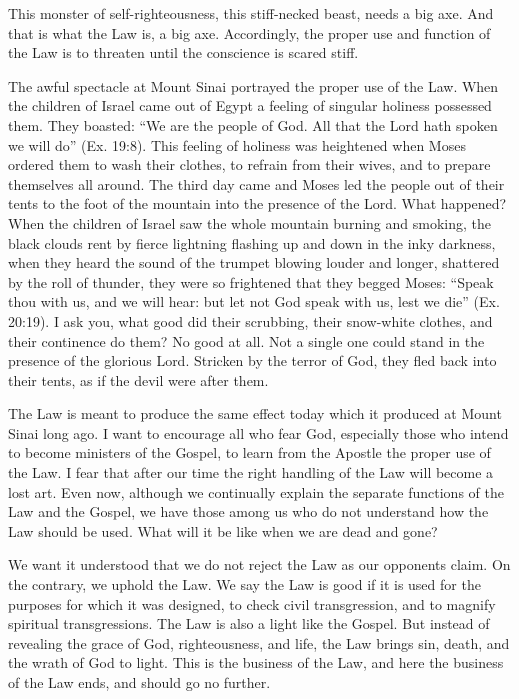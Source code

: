 This monster of self-righteousness, this stiff-necked beast, needs a big axe. And that is what the Law is, a big axe. Accordingly, the proper use and function of the Law is to threaten until the conscience is scared stiff.

The awful spectacle at Mount Sinai portrayed the proper use of the Law. When the children of Israel came out of Egypt a feeling of singular holiness possessed them. They boasted: “We are the people of God. All that the Lord hath spoken we will do” (Ex. 19:8). This feeling of holiness was heightened when Moses ordered them to wash their clothes, to refrain from their wives, and to prepare themselves all around. The third day came and Moses led the people out of their tents to the foot of the mountain into the presence of the Lord. What happened? When the children of Israel saw the whole mountain burning and smoking, the black clouds rent by fierce lightning flashing up and down in the inky darkness, when they heard the sound of the trumpet blowing louder and longer, shattered by the roll of thunder, they were so frightened that they begged Moses: “Speak thou with us, and we will hear: but let not God speak with us, lest we die” (Ex. 20:19). I ask you, what good did their scrubbing, their snow-white clothes, and their continence do them? No good at all. Not a single one could stand in the presence of the glorious Lord. Stricken by the terror of God, they fled back into their tents, as if the devil were after them.

The Law is meant to produce the same effect today which it produced at Mount Sinai long ago. I want to encourage all who fear God, especially those who intend to become ministers of the Gospel, to learn from the Apostle the proper use of the Law. I fear that after our time the right handling of the Law will become a lost art. Even now, although we continually explain the separate functions of the Law and the Gospel, we have those among us who do not understand how the Law should be used. What will it be like when we are dead and gone?

We want it understood that we do not reject the Law as our opponents claim. On the contrary, we uphold the Law. We say the Law is good if it is used for the purposes for which it was designed, to check civil transgression, and to magnify spiritual transgressions. The Law is also a light like the Gospel. But instead of revealing the grace of God, righteousness, and life, the Law brings sin, death, and the wrath of God to light. This is the business of the Law, and here the business of the Law ends, and should go no further.

